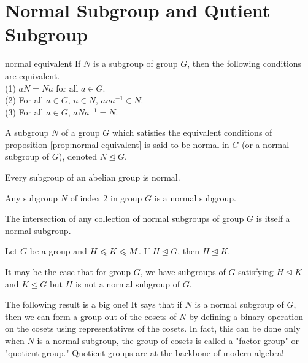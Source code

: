 \chapter{Normal Subgroup and Qutient Subgroup}\label{chp:1_7}

\begin{proposition}{}{normal equivalent}
    If $N$ is a subgroup of group $G$, then the following conditions are equivalent.\\
    (1) $aN=Na$ for all $a\in G$.\\
    (2) For all $a\in G$, $n\in N$, $ana^{-1}\in N$.\\
    (3) For all $a\in G$, $aNa^{-1}=N$.
\end{proposition}

\begin{definition}{}{}
    A subgroup $N$ of a group $G$ 
    which satisfies the equivalent
    conditions of proposition \ref{prop:normal equivalent} 
    is said to be normal in $G$ (or a normal subgroup of $G$),
    denoted $N\unlhd G$.
\end{definition}

\begin{proposition}{}{}
    Every subgroup of an abelian group is normal.
\end{proposition}

\begin{proposition}{}{}
    Any subgroup $N$ of index 2 in group $G$ is a normal subgroup.
\end{proposition}

\begin{proposition}{}{}
    The intersection of any collection of normal subgroups
    of group $G$ is itself a normal subgroup.
\end{proposition}

\begin{proposition}{}{}
    Let $G$ be a group and $H\leqslant K\leqslant M$.
    If $H\unlhd G$, then $H\unlhd K$.
\end{proposition}

\begin{remark}
    It may be the case that for group $G$, 
    we have subgroups of $G$ satisfying
    $H\unlhd K$ and $K\unlhd G$ but $H$ 
    is not a normal subgroup of $G$.
\end{remark}

The following result is a big one! 
It says that if $N$ is a normal subgroup of
$G$, then we can form a group out of the cosets of $N$ 
by defining a binary operation on the cosets using representatives of the cosets. 
In fact, this can be done only
when $N$ is a normal subgroup, 
the group of cosets is called a "factor group" or "quotient group." 
Quotient groups are at the backbone of modern algebra!

